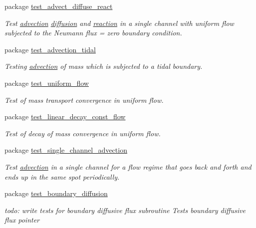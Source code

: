 \begin{CompactItemize}
\item 
package \hyperlink{a00074}{test\_\-advect\_\-diffuse\_\-react}
\begin{CompactList}\small\item\em Test \hyperlink{a00052}{advection} \hyperlink{a00056}{diffusion} and \hyperlink{a00068}{reaction} in a single channel with uniform flow subjected to the Neumann flux = zero boundary condition. \item\end{CompactList}

\item 
package \hyperlink{a00075}{test\_\-advection\_\-tidal}
\begin{CompactList}\small\item\em Testing \hyperlink{a00052}{advection} of mass which is subjected to a tidal boundary. \item\end{CompactList}

\item 
package \hyperlink{a00096}{test\_\-uniform\_\-flow}
\begin{CompactList}\small\item\em Test of mass transport convergence in uniform flow. \item\end{CompactList}

\item 
package \hyperlink{a00088}{test\_\-linear\_\-decay\_\-const\_\-flow}
\begin{CompactList}\small\item\em Test of decay of mass convergence in uniform flow. \item\end{CompactList}

\item 
package \hyperlink{a00094}{test\_\-single\_\-channel\_\-advection}
\begin{CompactList}\small\item\em Test \hyperlink{a00052}{advection} in a single channel for a flow regime that goes back and forth and ends up in the same spot periodically. \item\end{CompactList}

\item 
package \hyperlink{a00076}{test\_\-boundary\_\-diffusion}
\begin{CompactList}\small\item\em todo: write tests for boundary diffusive flux subroutine Tests boundary diffusive flux pointer \item\end{CompactList}


\end{CompactItemize}
